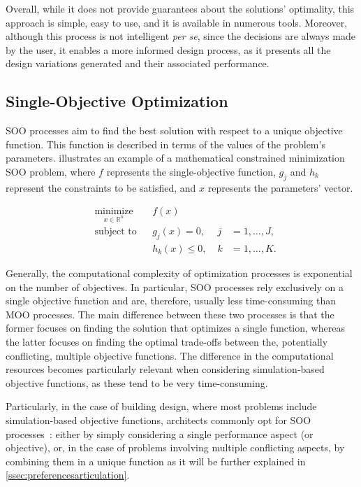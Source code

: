 	Overall, while it does not provide guarantees about the solutions’ optimality, this approach is simple, easy to use, and it is available in numerous tools. Moreover, although this process is not intelligent \textit{per se}, since the decisions are always made by the user, it enables a more informed design process, as it presents all the design variations generated and their associated performance.
	
	\subsection{Single-Objective Optimization}
	\label{ssec:soo}
	
	\ac{SOO} processes aim to find the best solution with respect to a unique objective function. This function is described in terms of the values of the problem's parameters.  illustrates an example of a mathematical constrained minimization \ac{SOO} problem, where $f$ represents the single-objective function, $g_j$ and $h_k$ represent the constraints to be satisfied, and $x$ represents the parameters' vector.
	
	\begin{equation} \label{eq:soo}
	\begin{aligned}
	& \underset{x \in \mathbb{R}^n}{\text{minimize}}
	& & f(x) \\
	& \text{subject to}
	& & g_j(x) = 0, & \; j &= 1, \ldots, J, \\ 
	&&& h_k(x) \leq 0, & \; k &= 1, \ldots, K.
	\end{aligned}
	\end{equation}
	
	Generally, the computational complexity of optimization processes is exponential on the number of objectives. In particular, \ac{SOO} processes rely exclusively on a single objective function and are, therefore, usually less time-consuming than \ac{MOO} processes. The main difference between these two processes is that the former focuses on finding the solution that optimizes a single function, whereas the latter focuses on finding the optimal trade-offs between the, potentially conflicting, multiple objective functions. The difference in the computational resources becomes particularly relevant when considering simulation-based objective functions, as these tend to be very time-consuming. 
	
	Particularly, in the case of building design, where most problems include simulation-based objective functions, architects commonly opt for \ac{SOO} processes~\cite{Wortmann2017Opossum}: either by simply considering a single performance aspect (or objective), or, in the case of problems involving multiple conflicting aspects, by combining them in a unique function as it will be further explained in \cref{ssec:preferencesarticulation}.
		
